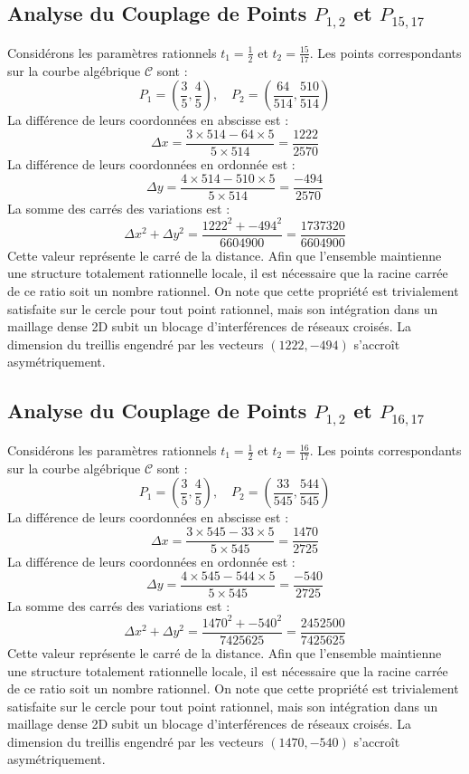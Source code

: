 \documentclass[12pt, a4paper]{article}
\begin{document}
\subsection{Analyse du Couplage de Points $P_{1,2}$ et $P_{15,17}$}
Considérons les paramètres rationnels $t_1 = \frac{1}{2}$ et $t_2 = \frac{15}{17}$.
Les points correspondants sur la courbe algébrique $\mathcal{C}$ sont :
$$ P_1 = \left( \frac{3}{5}, \frac{4}{5} \right), \quad P_2 = \left( \frac{64}{514}, \frac{510}{514} \right) $$
La différence de leurs coordonnées en abscisse est :
$$ \Delta x = \frac{3 \times 514 - 64 \times 5}{5 \times 514} = \frac{1222}{2570} $$
La différence de leurs coordonnées en ordonnée est :
$$ \Delta y = \frac{4 \times 514 - 510 \times 5}{5 \times 514} = \frac{-494}{2570} $$
La somme des carrés des variations est :
$$ \Delta x^2 + \Delta y^2 = \frac{ 1222^2 + -494^2 }{ 6604900 } = \frac{ 1737320 }{ 6604900 } $$
Cette valeur représente le carré de la distance. Afin que l'ensemble maintienne une structure totalement rationnelle locale, il est nécessaire que la racine carrée de ce ratio soit un nombre rationnel. On note que cette propriété est trivialement satisfaite sur le cercle pour tout point rationnel, mais son intégration dans un maillage dense 2D subit un blocage d'interférences de réseaux croisés. La dimension du treillis engendré par les vecteurs $( 1222, -494 )$ s'accroît asymétriquement.


\subsection{Analyse du Couplage de Points $P_{1,2}$ et $P_{16,17}$}
Considérons les paramètres rationnels $t_1 = \frac{1}{2}$ et $t_2 = \frac{16}{17}$.
Les points correspondants sur la courbe algébrique $\mathcal{C}$ sont :
$$ P_1 = \left( \frac{3}{5}, \frac{4}{5} \right), \quad P_2 = \left( \frac{33}{545}, \frac{544}{545} \right) $$
La différence de leurs coordonnées en abscisse est :
$$ \Delta x = \frac{3 \times 545 - 33 \times 5}{5 \times 545} = \frac{1470}{2725} $$
La différence de leurs coordonnées en ordonnée est :
$$ \Delta y = \frac{4 \times 545 - 544 \times 5}{5 \times 545} = \frac{-540}{2725} $$
La somme des carrés des variations est :
$$ \Delta x^2 + \Delta y^2 = \frac{ 1470^2 + -540^2 }{ 7425625 } = \frac{ 2452500 }{ 7425625 } $$
Cette valeur représente le carré de la distance. Afin que l'ensemble maintienne une structure totalement rationnelle locale, il est nécessaire que la racine carrée de ce ratio soit un nombre rationnel. On note que cette propriété est trivialement satisfaite sur le cercle pour tout point rationnel, mais son intégration dans un maillage dense 2D subit un blocage d'interférences de réseaux croisés. La dimension du treillis engendré par les vecteurs $( 1470, -540 )$ s'accroît asymétriquement.
\end{document}
